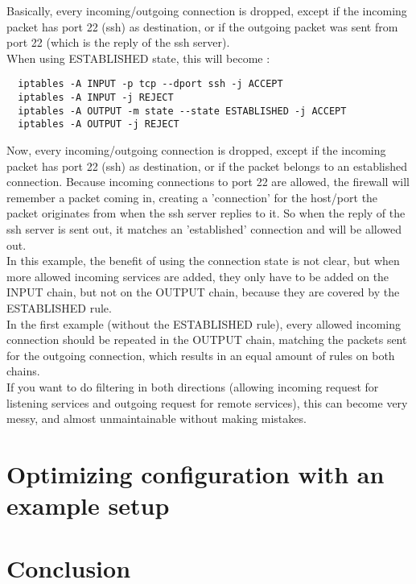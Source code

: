 \documentclass[a4paper,12pt]{article}
\begin{document}
Basically, every incoming/outgoing connection is dropped, except if the incoming packet has port 22 (ssh) as destination, or if the outgoing packet was sent from port 22 (which is the reply of the ssh server).\\

When using ESTABLISHED state, this will become :
\begin{verbatim}
  iptables -A INPUT -p tcp --dport ssh -j ACCEPT
  iptables -A INPUT -j REJECT
  iptables -A OUTPUT -m state --state ESTABLISHED -j ACCEPT
  iptables -A OUTPUT -j REJECT
\end{verbatim}

Now, every incoming/outgoing connection is dropped, except if the incoming packet has port 22 (ssh) as destination, or if the packet belongs to an established connection. Because incoming connections to port 22 are allowed, the firewall will remember a packet coming in, creating a 'connection' for the host/port the packet originates from when the ssh server replies to it. So when the reply of the ssh server is sent out, it matches an 'established' connection and will be allowed out.\\

In this example, the benefit of using the connection state is not clear, but when more allowed incoming services are added, they only have to be added on the INPUT chain, but not on the OUTPUT chain, because they are covered by the ESTABLISHED rule.\\
In the first example (without the ESTABLISHED rule), every allowed incoming connection should be repeated in the OUTPUT chain, matching the packets sent for the outgoing connection, which results in an equal amount of rules on both chains.\\
If you want to do filtering in both directions (allowing incoming request for listening services and outgoing request for remote services), this can become very messy, and almost unmaintainable without making mistakes.\\
\section{Optimizing configuration with an example setup}
\section{Conclusion}
\end{document}
